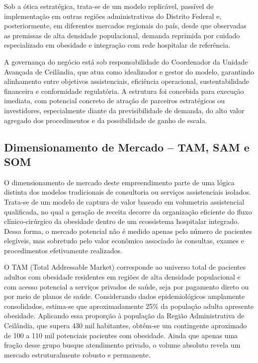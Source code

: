 \documentclass[12pt]{article}
\begin{document}
Sob a ótica estratégica, trata-se de um modelo replicável, passível de implementação em outras regiões administrativas do Distrito Federal e, posteriormente, em diferentes mercados regionais do país, desde que observadas as premissas de alta densidade populacional, demanda reprimida por cuidado especializado em obesidade e integração com rede hospitalar de referência.

A governança do negócio está sob responsabilidade do Coordenador da Unidade Avançada de Ceilândia, que atua como idealizador e gestor do modelo, garantindo alinhamento entre objetivos assistenciais, eficiência operacional, sustentabilidade financeira e conformidade regulatória. A estrutura foi concebida para execução imediata, com potencial concreto de atração de parceiros estratégicos ou investidores, especialmente diante da previsibilidade de demanda, do alto valor agregado dos procedimentos e da possibilidade de ganho de escala.

\subsection{Dimensionamento de Mercado – TAM, SAM e SOM}
\label{sec:org8cd699f}
O dimensionamento de mercado deste empreendimento parte de uma lógica distinta dos modelos tradicionais de consultoria ou serviços assistenciais isolados. Trata-se de um modelo de captura de valor baseado em volumetria assistencial qualificada, no qual a geração de receita decorre da organização eficiente do fluxo clínico-cirúrgico da obesidade dentro de um ecossistema hospitalar integrado. Dessa forma, o mercado potencial não é medido apenas pelo número de pacientes elegíveis, mas sobretudo pelo valor econômico associado às consultas, exames e procedimentos efetivamente realizados.

O TAM (Total Addressable Market) corresponde ao universo total de pacientes adultos com obesidade residentes em regiões de alta densidade populacional e com acesso potencial a serviços privados de saúde, seja por pagamento direto ou por meio de planos de saúde. Considerando dados epidemiológicos amplamente consolidados, estima-se que aproximadamente 25\% da população adulta apresente obesidade. Aplicando essa proporção à população da Região Administrativa de Ceilândia, que supera 430 mil habitantes, obtém-se um contingente aproximado de 100 a 110 mil potenciais pacientes com obesidade. Ainda que apenas uma fração desse grupo busque atendimento privado, o volume absoluto revela um mercado estruturalmente robusto e permanente.
\end{document}
